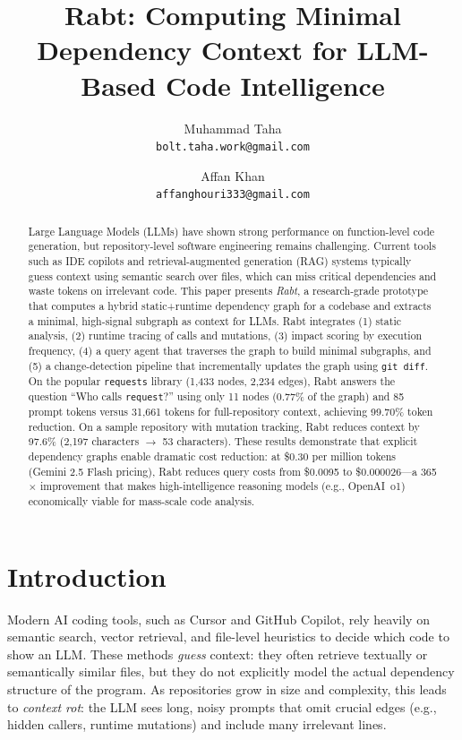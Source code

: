 \documentclass[11pt]{article}
\title{Rabt: Computing Minimal Dependency Context for LLM-Based Code Intelligence}
\author{Muhammad Taha\\[4pt]\texttt{bolt.taha.work@gmail.com}
  \and Affan Khan\\[4pt]\texttt{affanghouri333@gmail.com}}
\date{}
\begin{document}
\maketitle

\begin{abstract}
Large Language Models (LLMs) have shown strong performance on function-level code generation, but repository-level software engineering remains challenging.
Current tools such as IDE copilots and retrieval-augmented generation (RAG) systems typically guess context using semantic search over files, which can miss critical dependencies and waste tokens on irrelevant code.
This paper presents \emph{Rabt}, a research-grade prototype that computes a hybrid static+runtime dependency graph for a codebase and extracts a minimal, high-signal subgraph as context for LLMs.
Rabt integrates (1) static analysis, (2) runtime tracing of calls and mutations, (3) impact scoring by execution frequency, (4) a query agent that traverses the graph to build minimal subgraphs, and (5) a change-detection pipeline that incrementally updates the graph using \texttt{git diff}.
On the popular \texttt{requests} library (1,433 nodes, 2,234 edges), Rabt answers the question ``Who calls \texttt{request}?'' using only 11 nodes (0.77\% of the graph) and 85 prompt tokens versus 31,661 tokens for full-repository context, achieving 99.70\% token reduction.
On a sample repository with mutation tracking, Rabt reduces context by 97.6\% (2,197 characters $\rightarrow$ 53 characters).
These results demonstrate that explicit dependency graphs enable dramatic cost reduction: at \$0.30 per million tokens (Gemini 2.5 Flash pricing), Rabt reduces query costs from \$0.0095 to \$0.000026---a 365$\times$ improvement that makes high-intelligence reasoning models (e.g., OpenAI~o1) economically viable for mass-scale code analysis.
\end{abstract}

\section{Introduction}

Modern AI coding tools, such as Cursor and GitHub Copilot, rely heavily on semantic search, vector retrieval, and file-level heuristics to decide which code to show an LLM.
These methods \emph{guess} context: they often retrieve textually or semantically similar files, but they do not explicitly model the actual dependency structure of the program.
As repositories grow in size and complexity, this leads to \emph{context rot}: the LLM sees long, noisy prompts that omit crucial edges (e.g., hidden callers, runtime mutations) and include many irrelevant lines.
\end{document}
